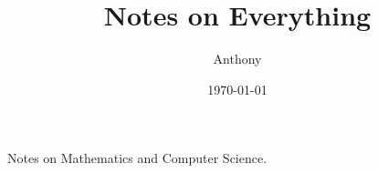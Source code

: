\documentclass{book}
\title{Notes on Everything}
\author{Anthony}
\date{\today}
\begin{document}
\maketitle %

Notes on Mathematics and Computer Science.

\tableofcontents %

\listoffigures






\ForceHTMLPage 	%
\ForceHTMLTOC 	%
\printindex
\end{document}
